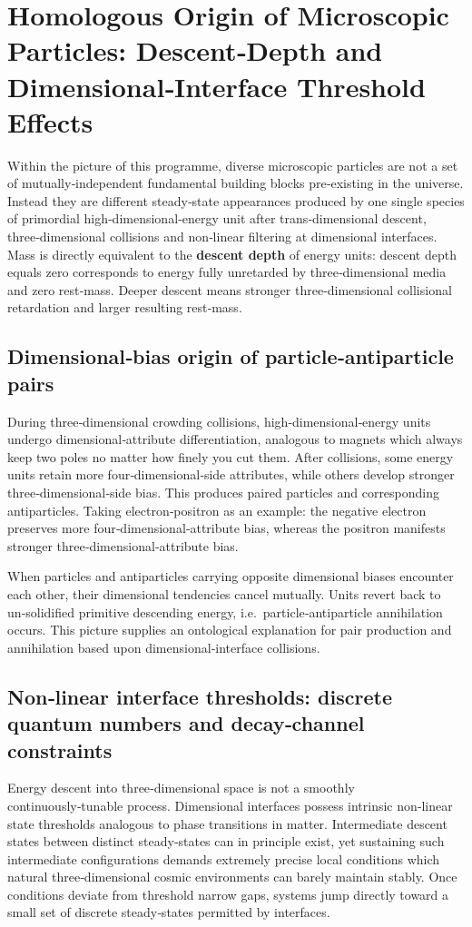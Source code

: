\documentclass[12pt,a4paper]{article}
\begin{document}
\section{Homologous Origin of Microscopic Particles: Descent‑Depth and Dimensional‑Interface Threshold Effects}
Within the picture of this programme, diverse microscopic particles are not a set of mutually‑independent fundamental building blocks pre‑existing in the universe. Instead they are different steady‑state appearances produced by one single species of primordial high‑dimensional‑energy unit after trans‑dimensional descent, three‑dimensional collisions and non‑linear filtering at dimensional interfaces. Mass is directly equivalent to the \textbf{descent depth} of energy units: descent depth equals zero corresponds to energy fully unretarded by three‑dimensional media and zero rest‑mass. Deeper descent means stronger three‑dimensional collisional retardation and larger resulting rest‑mass.

\subsection{Dimensional‑bias origin of particle‑antiparticle pairs}
During three‑dimensional crowding collisions, high‑dimensional‑energy units undergo dimensional‑attribute differentiation, analogous to magnets which always keep two poles no matter how finely you cut them. After collisions, some energy units retain more four‑dimensional‑side attributes, while others develop stronger three‑dimensional‑side bias. This produces paired particles and corresponding antiparticles. Taking electron‑positron as an example: the negative electron preserves more four‑dimensional‑attribute bias, whereas the positron manifests stronger three‑dimensional‑attribute bias.

When particles and antiparticles carrying opposite dimensional biases encounter each other, their dimensional tendencies cancel mutually. Units revert back to un‑solidified primitive descending energy, i.e.~particle‑antiparticle annihilation occurs. This picture supplies an ontological explanation for pair production and annihilation based upon dimensional‑interface collisions.

\subsection{Non‑linear interface thresholds: discrete quantum numbers and decay‑channel constraints}
Energy descent into three‑dimensional space is not a smoothly continuously‑tunable process. Dimensional interfaces possess intrinsic non‑linear state thresholds analogous to phase transitions in matter. Intermediate descent states between distinct steady‑states can in principle exist, yet sustaining such intermediate configurations demands extremely precise local conditions which natural three‑dimensional cosmic environments can barely maintain stably. Once conditions deviate from threshold narrow gaps, systems jump directly toward a small set of discrete steady‑states permitted by interfaces.
\end{document}
